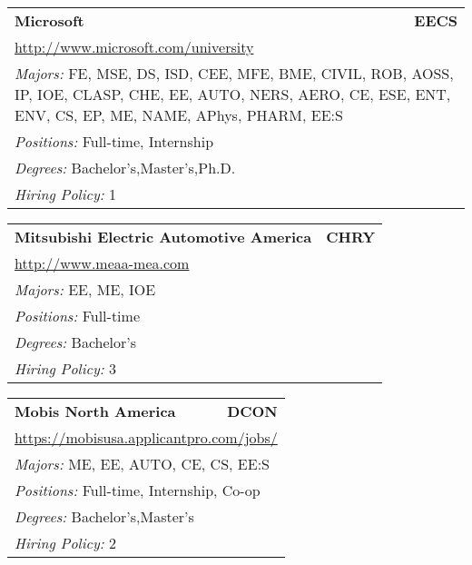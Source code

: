 \documentclass[twoside]{article}
\begin{document}
\begin{center}
\begin{multicols}{3}
\begin{FlushLeft}
\begin{minipage}{\columnwidth}\begin{tabularx}{.95\columnwidth}{Xr}
                 {\Large\bf Microsoft} & {\Large\bf EECS}\\
    \multicolumn{2}{p{.95\columnwidth}}{\url{http://www.microsoft.com/university}}\\
    \multicolumn{2}{p{.95\columnwidth}}{\emph{Majors:} FE, MSE, DS, ISD, CEE, MFE, BME, CIVIL, ROB, AOSS, IP, IOE, CLASP, CHE, EE, AUTO, NERS, AERO, CE, ESE, ENT, ENV, CS, EP, ME, NAME, APhys, PHARM, EE:S}\\
    \multicolumn{2}{p{.95\columnwidth}}{\emph{Positions:} Full-time, Internship}\\
    \multicolumn{2}{p{.95\columnwidth}}{\emph{Degrees:} Bachelor's,Master's,Ph.D.}\\
    \multicolumn{2}{p{.95\columnwidth}}{\emph{Hiring Policy:} 1}\\
    \end{tabularx}
    
\end{minipage}
 
\begin{minipage}{\columnwidth}\begin{tabularx}{.95\columnwidth}{Xr}
                 {\Large\bf Mitsubishi Electric Automotive America} & {\Large\bf CHRY}\\
    \multicolumn{2}{p{.95\columnwidth}}{\url{http://www.meaa-mea.com}}\\
    \multicolumn{2}{p{.95\columnwidth}}{\emph{Majors:} EE, ME, IOE}\\
    \multicolumn{2}{p{.95\columnwidth}}{\emph{Positions:} Full-time}\\
    \multicolumn{2}{p{.95\columnwidth}}{\emph{Degrees:} Bachelor's}\\
    \multicolumn{2}{p{.95\columnwidth}}{\emph{Hiring Policy:} 3}\\
    \end{tabularx}
    
\end{minipage}
 
\begin{minipage}{\columnwidth}\begin{tabularx}{.95\columnwidth}{Xr}
                 {\Large\bf Mobis North America} & {\Large\bf DCON}\\
    \multicolumn{2}{p{.95\columnwidth}}{\url{https://mobisusa.applicantpro.com/jobs/}}\\
    \multicolumn{2}{p{.95\columnwidth}}{\emph{Majors:} ME, EE, AUTO, CE, CS, EE:S}\\
    \multicolumn{2}{p{.95\columnwidth}}{\emph{Positions:} Full-time, Internship, Co-op}\\
    \multicolumn{2}{p{.95\columnwidth}}{\emph{Degrees:} Bachelor's,Master's}\\
    \multicolumn{2}{p{.95\columnwidth}}{\emph{Hiring Policy:} 2}\\
    \end{tabularx}
    

\end{minipage}
\end{FlushLeft}
\end{multicols}
\end{center}
\end{document}
